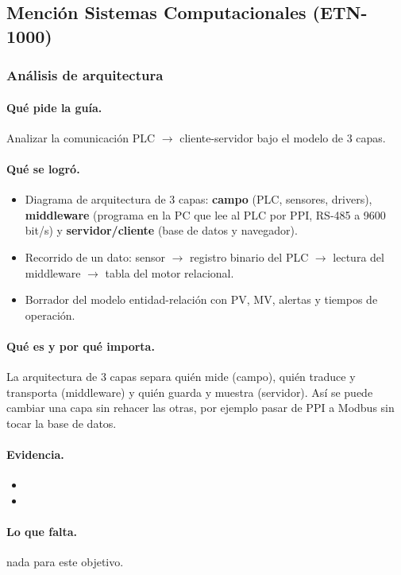 \documentclass[a4paper,11pt]{article}
\begin{document}
\subsection{Mención Sistemas Computacionales (ETN-1000)}
\subsubsection{Análisis de arquitectura}
\paragraph{Qué pide la guía.} Analizar la comunicación PLC $\to$ cliente-servidor bajo el modelo de 3 capas.
\paragraph{Qué se logró.}
\begin{itemize}
\item Diagrama de arquitectura de 3 capas: \textbf{campo} (PLC, sensores, drivers), \textbf{middleware} (programa en la PC que lee al PLC por PPI, RS-485 a 9600 bit/s) y \textbf{servidor/cliente} (base de datos y navegador).
\item Recorrido de un dato: sensor $\to$ registro binario del PLC $\to$ lectura del middleware $\to$ tabla del motor relacional.
\item Borrador del modelo entidad-relación con PV, MV, alertas y tiempos de operación.
\end{itemize}
\paragraph{Qué es y por qué importa.} La arquitectura de 3 capas separa quién mide (campo), quién traduce y transporta (middleware) y quién guarda y muestra (servidor). Así se puede cambiar una capa sin rehacer las otras, por ejemplo pasar de PPI a Modbus sin tocar la base de datos.
\paragraph{Evidencia.}
\begin{itemize}\small
\item {}
\item {}
\end{itemize}
\paragraph{Lo que falta.} nada para este objetivo.
\end{document}
